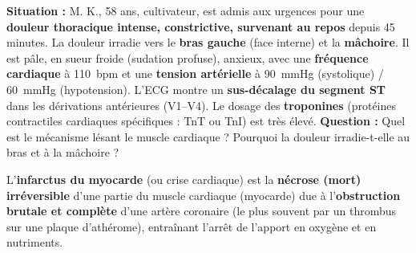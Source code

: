 \documentclass[11pt]{article}
\begin{document}
\begin{experience}
\textbf{Situation :} M. K., 58 ans, cultivateur, est admis aux urgences pour une \textbf{douleur thoracique intense, constrictive, survenant au repos} depuis 45 minutes. La douleur irradie vers le \textbf{bras gauche} (face interne) et la \textbf{mâchoire}. Il est pâle, en sueur froide (sudation profuse), anxieux, avec une \textbf{fréquence cardiaque} à \SI{110}{bpm} et une \textbf{tension artérielle} à \SI{90}{mmHg} (systolique) / \SI{60}{mmHg} (hypotension). L'ECG montre un \textbf{sus-décalage du segment ST} dans les dérivations antérieures (V1--V4). Le dosage des \textbf{troponines} (protéines contractiles cardiaques spécifiques : TnT ou TnI) est très élevé.
\textbf{Question :} Quel est le mécanisme lésant le muscle cardiaque ? Pourquoi la douleur irradie-t-elle au bras et à la mâchoire ?
\end{experience}

\begin{definition}
L'\textbf{infarctus du myocarde} (ou crise cardiaque) est la \textbf{nécrose (mort) irréversible} d'une partie du muscle cardiaque (myocarde) due à l'\textbf{obstruction brutale et complète} d'une artère coronaire (le plus souvent par un thrombus sur une plaque d'athérome), entraînant l'arrêt de l'apport en oxygène et en nutriments.
\end{definition}
\end{document}
